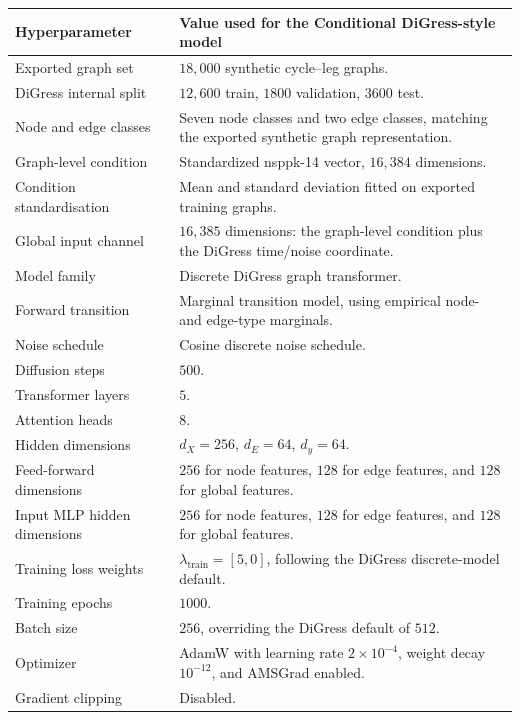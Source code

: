 \begin{table}[p]
\centering
\footnotesize
\begin{tabularx}{\textwidth}{@{}p{}X@{}}
\toprule
Hyperparameter & Value used for the Conditional DiGress-style model \\
\midrule
Exported graph set & \(18{,}000\) synthetic cycle--leg graphs. \\
DiGress internal split & \(12{,}600\) train, \(1800\) validation, \(3600\) test. \\
Node and edge classes & Seven node classes and two edge classes, matching the exported synthetic graph representation. \\
Graph-level condition & Standardized \gls{nsppk}-14 vector, \(16{,}384\) dimensions. \\
Condition standardisation & Mean and standard deviation fitted on exported training graphs. \\
Global input channel & \(16{,}385\) dimensions: the graph-level condition plus the DiGress time/noise coordinate. \\
Model family & Discrete DiGress graph transformer. \\
Forward transition & Marginal transition model, using empirical node- and edge-type marginals. \\
Noise schedule & Cosine discrete noise schedule. \\
Diffusion steps & \(500\). \\
Transformer layers & \(5\). \\
Attention heads & \(8\). \\
Hidden dimensions & \(d_X=256\), \(d_E=64\), \(d_y=64\). \\
Feed-forward dimensions & \(256\) for node features, \(128\) for edge features, and \(128\) for global features. \\
Input MLP hidden dimensions & \(256\) for node features, \(128\) for edge features, and \(128\) for global features. \\
Training loss weights & \(\lambda_{\mathrm{train}}=[5,0]\), following the DiGress discrete-model default. \\
Training epochs & \(1000\). \\
Batch size & \(256\), overriding the DiGress default of \(512\). \\
Optimizer & AdamW with learning rate \(2\times 10^{-4}\), weight decay \(10^{-12}\), and AMSGrad enabled. \\
Gradient clipping & Disabled. \\

\end{tabularx}
\end{table}
